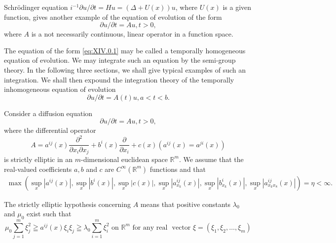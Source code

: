 Schrödinger equation 
$i^{-1}\partial u / \partial t = Hu = (\Delta +U(x))u$, where $U(x)$ is a given function, 
gives another example of the equation of evolution of the form 
\begin{equation}\label{eq:XIV.0.1}
\partial u / \partial t = A u, t > 0,
\end{equation}
where $A$ is a not necessarily continuous, linear operator in a function space. 

The equation of the form \eqref{eq:XIV.0.1} may be called a temporally homogeneous equation of evolution. We may integrate such an equation by the semi-group theory. In the following three sections, we shall give typical examples of such an integration. We shall then expound the integration theory of the temporally inhomogeneous equation of evolution 
\begin{equation}\label{eq:XIV.0.2}
\partial u / \partial t = A (t) u, a < t < b.
\end{equation}


\label{sec:XIV.1}

Consider a diffusion equation 
\begin{equation}\label{eq:XIV.1.1}
\partial u / \partial t = A u, t > 0,
\end{equation}
where the differential operator 
\begin{equation}\label{eq:XIV.1.2}
A = a ^{ij} (x) \frac {\partial^{2}}{\partial x _{i} \partial x _{j}} + b ^{i} (x) \frac {\partial}{\partial x _{i}} + c (x) \left(a ^{ij} (x) = a ^{ji} (x)\right)
\end{equation}
is strictly elliptic in an $m$-dimensional euclidean space $\mathbb{R}^{m}$. We assume that the real-valued coefficients $a, b$ and $c$ are $C^{\infty}(\mathbb{R}^{m})$ functions and that 
\begin{equation}\label{eq:XIV.1.3}
\begin{gathered}
\max \left(\sup\limits _{x} | a ^{ij} (x) |, \sup\limits _{x} | b ^{i} (x) |, \sup\limits _{x} | c (x) |, \sup\limits _{x} | a _ {x _{k}} ^{ij} (x) |, \right. \left. \sup\limits _{x} | b _ {x _{k}} ^{i} (x) |, \sup\limits _{x} | a _ {x _{k} x _{8}} ^{ij} (x) |\right) = \eta < \infty .
\end{gathered}
\end{equation}

The strictly elliptic hypothesis concerning $A$ means that positive constants $\lambda_{0}$ and $\mu_{0}$ exist such that 
\begin{equation}\mu_{0} \sum\limits_{j=1} ^{m} \xi_{j} ^{2} \geqq a ^{ij} (x) \xi_{i} \xi_{j} \geqq \lambda_{0} \sum\limits_{i=1} ^{m} \xi_{i} ^{2} \text{ on } \mathbb{R}^{m} \text{ for any real } \text{ vector } \xi = (\xi_{1}, \xi_{2}, \dots , \xi_{m}) \label{eq:XIV.1.4}\end{equation}

